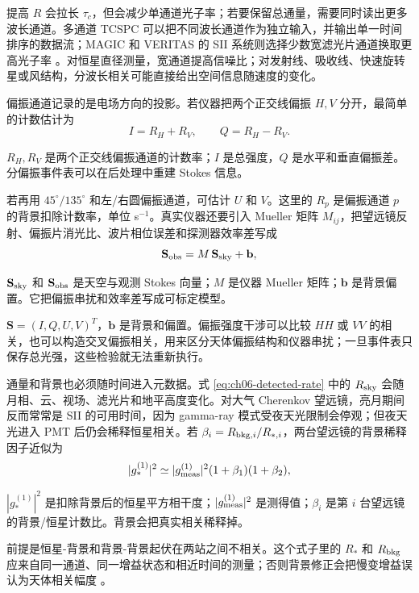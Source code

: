 提高 \(R\) 会拉长 \(\tau_c\)，但会减少单通道光子率；若要保留总通量，需要同时读出更多波长通道。多通道 TCSPC 可以把不同波长通道作为独立输入，并输出单一时间排序的数据流；MAGIC 和 VERITAS 的 SII 系统则选择少数宽滤光片通道换取更高光子率 \citep{2020RScI...91a3108W,2020NatAs...4.1164A,2024MNRAS.529.4387A}。对恒星直径测量，宽通道提高信噪比；对发射线、吸收线、快速旋转星或风结构，分波长相关可能直接给出空间信息随速度的变化。

偏振通道记录的是电场方向的投影。若仪器把两个正交线偏振 \(H,V\) 分开，最简单的计数估计为
\begin{equation}
  I=R_H+R_V,\qquad Q=R_H-R_V .
  \label{eq:ch06-stokes-hv}
\end{equation}
\begin{formulaexplain}
\(R_H,R_V\) 是两个正交线偏振通道的计数率；\(I\) 是总强度，\(Q\) 是水平和垂直偏振差。分偏振事件表可以在后处理中重建 Stokes 信息。
\end{formulaexplain}
若再用 \(45^\circ/135^\circ\) 和左/右圆偏振通道，可估计 \(U\) 和 \(V\)。这里的 \(R_p\) 是偏振通道 \(p\) 的背景扣除计数率，单位 s\(^{-1}\)。真实仪器还要引入 Mueller 矩阵 \(M_{ij}\)，把望远镜反射、偏振片消光比、波片相位误差和探测器效率差写成
\begin{equation}
  \mathbf{S}_{\rm obs}=M\,\mathbf{S}_{\rm sky}+\mathbf{b},
  \label{eq:ch06-mueller}
\end{equation}
\begin{formulaexplain}
\(\mathbf S_{\rm sky}\) 和 \(\mathbf S_{\rm obs}\) 是天空与观测 Stokes 向量；\(M\) 是仪器 Mueller 矩阵；\(\mathbf b\) 是背景偏置。它把偏振串扰和效率差写成可标定模型。
\end{formulaexplain}
\(\mathbf{S}=(I,Q,U,V)^T\)，\(\mathbf{b}\) 是背景和偏置。偏振强度干涉可以比较 \(HH\) 或 \(VV\) 的相关，也可以构造交叉偏振相关，用来区分天体偏振结构和仪器串扰；一旦事件表只保存总光强，这些检验就无法重新执行。

通量和背景也必须随时间进入元数据。式 \eqref{eq:ch06-detected-rate} 中的 \(R_{\rm sky}\) 会随月相、云、视场、滤光片和地平高度变化。对大气 Cherenkov 望远镜，亮月期间反而常常是 SII 的可用时间，因为 gamma-ray 模式受夜天光限制会停观；但夜天光进入 PMT 后仍会稀释恒星相关。若 \(\beta_i=R_{{\rm bkg},i}/R_{*,i}\)，两台望远镜的背景稀释因子近似为
\begin{equation}
  |g^{(1)}_*|^2
  \simeq
  |g^{(1)}_{\rm meas}|^2
  (1+\beta_1)(1+\beta_2),
  \label{eq:ch06-background-dilution}
\end{equation}
\begin{formulaexplain}
\(|g_*^{(1)}|^2\) 是扣除背景后的恒星平方相干度；\(|g_{\rm meas}^{(1)}|^2\) 是测得值；\(\beta_i\) 是第 \(i\) 台望远镜的背景/恒星计数比。背景会把真实相关稀释掉。
\end{formulaexplain}
前提是恒星-背景和背景-背景起伏在两站之间不相关。这个式子里的 \(R_*\) 和 \(R_{\rm bkg}\) 应来自同一通道、同一增益状态和相近时间的测量；否则背景修正会把慢变增益误认为天体相关幅度 \citep{2020NatAs...4.1164A,2024MNRAS.529.4387A}。

